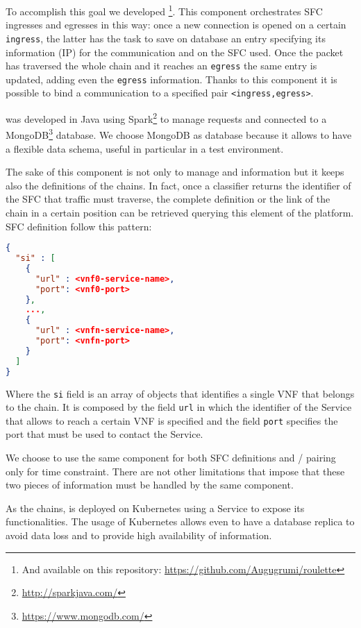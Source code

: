 \noindent
To accomplish this goal we developed \roulette{}\footnote{And available on
this repository: \url{https://github.com/Augugrumi/roulette}}. This component
orchestrates SFC ingresses and egresses in this way: once a new connection is
opened on a certain \texttt{ingress}, the latter has the task to save on 
\roulette{} database an entry specifying its information (IP) for the
communication and on the SFC used. Once the packet has traversed the whole chain
and it reaches an \texttt{egress} the same entry is updated, adding even the 
\texttt{egress} information. Thanks to this component it is possible to bind a
communication to a specified pair \verb!<ingress,egress>!.

\roulette{} was developed in Java using
Spark\footnote{\url{http://sparkjava.com/}} to manage requests and
connected to a MongoDB\footnote{\url{https://www.mongodb.com/}} database. We
choose MongoDB as database because it allows to have a flexible data schema,
useful in particular in a test environment.

The sake of this component is not only to manage \ingresses{} and \egresses{}
information but it keeps also the definitions of the chains. In fact, once a
classifier returns the identifier of the SFC that traffic must traverse, the
complete definition or the link of the chain in a certain position can be
retrieved querying this element of the platform. SFC definition follow this
pattern:

\begin{lstlisting}[caption={Definition of an SFC on \roulette{}.}, captionpos=b,
                   language=json]
{
  "si" : [
    {
      "url" : <vnf0-service-name>,
      "port": <vnf0-port>
    },
    ...,
    {
      "url" : <vnfn-service-name>,
      "port": <vnfn-port>
    }
  ]
}
\end{lstlisting}

\noindent
Where the \texttt{si} field is an array of objects that identifies a single VNF
that belongs to the chain. It is composed by the field \texttt{url} in which the
identifier of the Service that allows to reach a certain VNF is specified and
the field \texttt{port} specifies the port that must be used to contact the
Service.

We choose to use the same component for both SFC definitions and 
\ingress{}/\egresses{} pairing only for time constraint. There are not other
limitations that impose that these two pieces of information must be handled by
the same component. 

As the chains, \roulette{} is deployed on Kubernetes using a Service to expose
its functionalities. The usage of Kubernetes allows even to have a database
replica to avoid data loss and to provide high availability of information.

